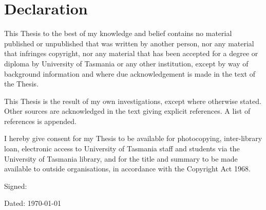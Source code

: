 \chapter{Declaration}

This Thesis to the best of my knowledge and belief contains no material published or unpublished that was written by another person, nor any material that infringes copyright, nor any material that has been accepted for a degree or diploma by University of Tasmania or any other institution, except by way of background information and where due acknowledgement is made in the text of the Thesis.

This Thesis is the result of my own investigations, except where otherwise stated. Other sources are acknowledged in the text giving explicit references. A list of references is appended.


I hereby give consent for my Thesis to be available for photocopying, inter-library loan, electronic access to University of Tasmania staff and students via the University of Tasmania library, and for the title and summary to be made available to outside organisations, in accordance with the Copyright Act 1968. 


   \bigskip
   \bigskip

Signed:

   \bigskip
   \bigskip

Dated: \today      %